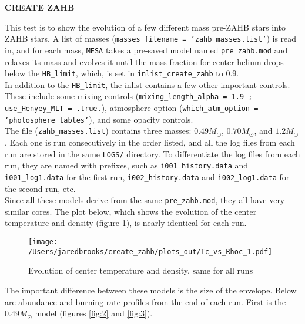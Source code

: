 \documentclass{article}
\begin{document}
	
	\begin{center}
	  \begin{Large}
	    \textbf{CREATE ZAHB}\\
	  \end{Large}
	\end{center}

        This test is to show the evolution of a few different mass pre-ZAHB stars into ZAHB stars.  A list of masses (\texttt{masses\_filename = 'zahb\_masses.list'}) is read in, and for each mass, \texttt{MESA} takes a pre-saved model named \texttt{pre\_zahb.mod} and relaxes its mass and evolves it until the mass fraction for center helium drops below the \texttt{HB\_limit}, which, is set in \texttt{inlist\_create\_zahb} to 0.9.\\

        In addition to the \texttt{HB\_limit}, the inlist contains a few other important controls.  These include some mixing controls (\texttt{mixing\_length\_alpha = 1.9 ; use\_Henyey\_MLT = .true.}), atmosphere option (\texttt{which\_atm\_option = 'photosph\-ere\_tables'}), and some opacity controls.\\

        The file (\texttt{zahb\_masses.list}) contains three masses: $0.49 M_\odot$, $0.70 M_\odot$, and $1.2 M_\odot$.  Each one is run consecutively in the order listed, and all the log files from each run are stored in the same \texttt{LOGS/} directory.  To differentiate the log files from each run, they are named with prefixes, such as \texttt{i001\_history.data} and \texttt{i001\_log1.data} for the first run, \texttt{i002\_history.data} and \texttt{i002\_log1.data} for the second run, etc.\\

        Since all these models derive from the same \texttt{pre\_zahb.mod}, they all have very similar cores.  The plot below, which shows the evolution of the center temperature and density (figure \ref{fig:1}), is nearly identical for each run.


        \begin{figure}[H]
          \centering
          \texttt{[image: /Users/jaredbrooks/create\_zahb/plots\_out/Tc\_vs\_Rhoc\_1.pdf]}
          \caption{Evolution of center temperature and density, same for all runs}
          \label{fig:1}
        \end{figure}

        \pagebreak

        The important difference between these models is the size of the envelope.  Below are abundance and burning rate profiles from the end of each run.  First is the $0.49 M_\odot$ model (figures \ref{fig:2} and \ref{fig:3}).
\end{document}
